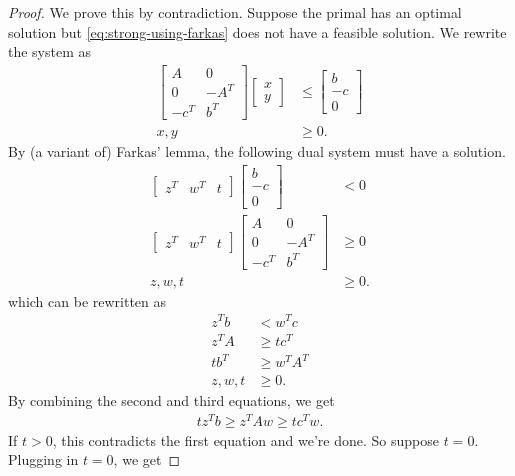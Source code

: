 \documentclass[
]{book}
\theoremstyle{definition}
\theoremstyle{definition}
\theoremstyle{definition}
\theoremstyle{definition}
\theoremstyle{remark}
\begin{document}
\begin{proof}
We prove this by contradiction. Suppose the primal has an optimal solution but \eqref{eq:strong-using-farkas} does not have a feasible solution. We rewrite the system as
\begin{align*}
    \begin{bmatrix} A & 0 \\ 0 & -A^T \\ -c^T & b^T \end{bmatrix}
    \begin{bmatrix} x \\ y  \end{bmatrix}
      & \le 
    \begin{bmatrix} b \\ -c \\ 0 \end{bmatrix} \\
    x, y & \ge 0.
\end{align*}
By (a variant of) Farkas' lemma, the following dual system must have a solution.
\begin{align*}
  \begin{bmatrix} z^T & w^T & t \end{bmatrix}
  \begin{bmatrix} b \\ -c \\ 0 \end{bmatrix} & < 0 \\
  \begin{bmatrix} z^T & w^T & t \end{bmatrix}
    \begin{bmatrix} A & 0 \\ 0 & -A^T \\ -c^T & b^T \end{bmatrix}
    & \ge 0\\
  z, w, t & \ge 0.
\end{align*}
which can be rewritten as
\begin{align*}
    z^T b & < w^T c \\
    z^T A & \ge t c^T \\
    t b^T & \ge w^T A^T \\
    z, w, t & \ge 0.
\end{align*}
By combining the second and third equations, we get
\begin{align*}
    t z^T b \ge z^T A w \ge t c^T w.
\end{align*}
If \(t > 0\), this contradicts the first equation and we're done. So suppose \(t = 0\). Plugging in \(t = 0\), we get

\end{proof}
\end{document}
